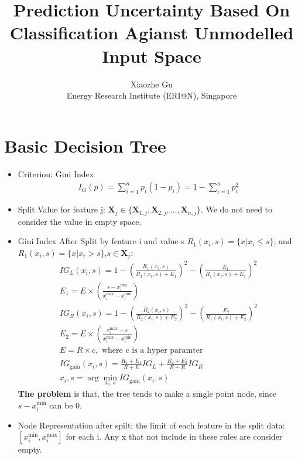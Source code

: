\documentclass[11pt,onecolumn]{IEEEtran}
\begin{document}
     
\title{Prediction Uncertainty Based On Classification Agianst Unmodelled Input Space}
\author{Xiaozhe Gu\\Energy Research Institute (ERI@N), Singapore }

\maketitle

\section{Basic Decision Tree}
\begin{itemize}
  \item Criterion: Gini Index
\begin{align*}
I_G(p)=\sum_{i=1}^np_i(1-p_i)=1-\sum_{i=1}^n p_i^2
\end{align*}
\item Split Value for feature j: $\mathbf X_j\in  \{\mathbf X_{1,j},\mathbf X_{2,j},\ldots,\mathbf X_{n,j}\}$. We do not need to consider the value in empty space.
\item Gini Index After Split by feature i and value s $R_1(x_i,s)=\{x|x_i\leq s\}$, and $R_1(x_i,s)=\{x|x_i>s\}$,$s \in \mathbf X_j$:
\begin{align*}
IG_L(x_i,s)=1-\left(\frac{R_1(x_i,s)}{R_1(x_i,s)+E_1}\right)^2-\left(\frac{E_1}{R_1(x_i,s)+E_1}\right)^2\\
E_1=E\times \left(\frac{s-x_i^{\mbox{min}}}{x_i^{\mbox{max}}-x_i^{\mbox{min}}}\right)\\
IG_R(x_i,s)=1-\left(\frac{R_2(x_i,s)}{R_2(x_i,s)+E_2}\right)^2-\left(\frac{E_2}{R_1(x_i,s)+E_2}\right)^2\\
E_2=E\times \left(\frac{x_i^{\mbox{max}}-s}{x_i^{\mbox{max}}-x_i^{\mbox{min}}}\right)\\
E=R\times c,\mbox{ where c is a hyper paramter}\\ 
IG_{\mbox{gain}}(x_i,s)=\frac{R_1+E_1}{R+E}IG_L+\frac{R_2+E_2}{E+R}IG_R\\
x_i,s=\arg \min_{x_i,s} IG_{\mbox{gain}}(x_i,s)
\end{align*}
\textbf{The problem }is that, the tree tends to make a single point node, since $s-x_i^{\mbox{min}}$ can be 0.
\item Node Representation after spilt: the limit of each feature in the split data:  $[x_i^{\mbox{min}},x_i^{\mbox{max}}]$ for each i.  Any x that not include in these rules are consider empty. 
  \begin{figure}[h]

\end{figure}
\end{itemize}
\end{document}
